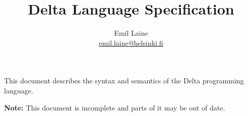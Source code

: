 \documentclass[oneside]{memoir}
\begin{document}
\title{Delta Language Specification}
\author{Emil Laine \\ \href{mailto:emil.laine@helsinki.fi}{emil.laine@helsinki.fi}}
\maketitle

This document describes the syntax and semantics of the Delta programming language.

\textbf{Note:} This document is incomplete and parts of it may be out of date.

\tableofcontents







\end{document}
